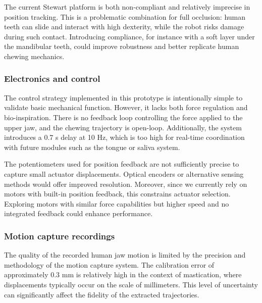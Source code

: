 The current Stewart platform is both non-compliant and relatively imprecise in position tracking. This is a problematic combination for full occlusion: human teeth 
can slide and interact with high dexterity, while the robot risks damage during such contact. Introducing compliance, for instance with a soft layer under the mandibular 
teeth, could improve robustness and better replicate human chewing mechanics.

\subsubsection{Electronics and control}
The control strategy implemented in this prototype is intentionally simple to validate basic mechanical function. However, it lacks both force regulation and 
bio-inspiration. There is no feedback loop controlling the force applied to the upper jaw, and the chewing trajectory is open-loop. Additionally, the system 
introduces a 0.7 s delay at 10 Hz, which is too high for real-time coordination with future modules such as the tongue or saliva system.

The potentiometers used for position feedback are not sufficiently precise to capture small actuator displacements. Optical encoders or alternative sensing methods 
would offer improved resolution. Moreover, since we currently rely on motors with built-in position feedback, this constrains actuator selection. Exploring motors 
with similar force capabilities but higher speed and no integrated feedback could enhance performance.

\subsubsection{Motion capture recordings}
\label{sec:motion_capture_limitations}

The quality of the recorded human jaw motion is limited by the precision and methodology of the motion capture system. The calibration error of approximately $0.3$ mm is 
relatively high in the context of mastication, where displacements typically occur on the scale of millimeters. This level of uncertainty can significantly 
affect the fidelity of the extracted trajectories.

